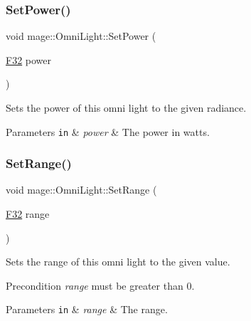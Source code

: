 \subsubsection{\texorpdfstring{Set\+Power()}{SetPower()}}
{\footnotesize\ttfamily void mage\+::\+Omni\+Light\+::\+Set\+Power (\begin{DoxyParamCaption}\item[{\hyperlink{namespacemage_aa97e833b45f06d60a0a9c4fc22ae02c0}{F32}}]{power }\end{DoxyParamCaption})\hspace{0.3cm}{\ttfamily [noexcept]}}

Sets the power of this omni light to the given radiance.


\begin{DoxyParams}[1]{Parameters}
\mbox{\tt in}  & {\em power} & The power in watts. \\
\hline
\end{DoxyParams}
\hypertarget{classmage_1_1_omni_light_a696ec6a022ccc3993d88c1d435938fb1}{}\label{classmage_1_1_omni_light_a696ec6a022ccc3993d88c1d435938fb1} 
\subsubsection{\texorpdfstring{Set\+Range()}{SetRange()}}
{\footnotesize\ttfamily void mage\+::\+Omni\+Light\+::\+Set\+Range (\begin{DoxyParamCaption}\item[{\hyperlink{namespacemage_aa97e833b45f06d60a0a9c4fc22ae02c0}{F32}}]{range }\end{DoxyParamCaption})\hspace{0.3cm}{\ttfamily [noexcept]}}

Sets the range of this omni light to the given value.

\begin{DoxyPrecond}{Precondition}
{\itshape range} must be greater than 0. 
\end{DoxyPrecond}

\begin{DoxyParams}[1]{Parameters}
\mbox{\tt in}  & {\em range} & The range. \\
\hline
\end{DoxyParams}
\hypertarget{classmage_1_1_omni_light_a337082a4e6026fe6f98098df063e6660}{}\label{classmage_1_1_omni_light_a337082a4e6026fe6f98098df063e6660} 
